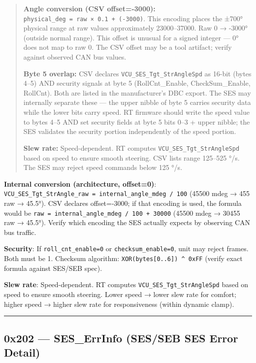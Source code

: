 \documentclass[12pt,a4paper,oneside]{report}
\begin{document}
\begin{quote}
\textbf{Angle conversion (CSV offset=-3000):}
\texttt{physical\_deg\ =\ raw\ ×\ 0.1\ +\ (-3000)}. This encoding places the
±700° physical range at raw values approximately 23000--37000. Raw 0 → -3000°
(outside normal range). This offset is unusual for a signed integer --- 0° does
not map to raw 0. The CSV offset may be a tool artifact; verify against observed
CAN bus values.

\textbf{Byte 5 overlap:} CSV declares \texttt{VCU\_SES\_Tgt\_StrAngleSpd} as
16-bit (bytes 4--5) AND security signals at byte 5 (RollCnt\_Enable,
CheckSum\_Enable, RollCnt). Both are listed in the manufacturer's DBC export.
The SES may internally separate these --- the upper nibble of byte 5 carries
security data while the lower bits carry speed. RT firmware should write the
speed value to bytes 4--5 AND set security fields at byte 5 bits 0--3 + upper
nibble; the SES validates the security portion independently of the speed
portion.

\textbf{Slew rate:} Speed-dependent. RT computes
\texttt{VCU\_SES\_Tgt\_StrAngleSpd} based on speed to ensure smooth steering.
CSV lists range 125--525 °/s. The SES may reject speed commands below 125 °/s.
\end{quote}

\textbf{Internal conversion (architecture, offset=0)}:
\texttt{VCU\_SES\_Tgt\_StrAngle\_raw\ =\ internal\_angle\_mdeg\ /\ 100} (45500
mdeg → 455 raw → 45.5°). CSV declares offset=-3000; if that encoding is used,
the formula would be \texttt{raw\ =\ internal\_angle\_mdeg\ /\ 100\ +\ 30000}
(45500 mdeg → 30455 raw → 45.5°). Verify which encoding the SES actually
expects by observing CAN bus traffic.

\textbf{Security}: If \texttt{roll\_cnt\_enable=0} or
\texttt{checksum\_enable=0}, unit may reject frames. Both must be 1. Checksum
algorithm: \texttt{XOR(bytes{[}0..6{]})\ \^{}\ 0xFF} (verify exact formula
against SES/SEB spec).

\textbf{Slew rate}: Speed-dependent. RT computes
\texttt{VCU\_SES\_Tgt\_StrAngleSpd} based on speed to ensure smooth steering.
Lower speed → lower slew rate for comfort; higher speed → higher slew rate for
responsiveness (within dynamic clamp).

\begin{center}\rule{0.5\linewidth}{0.5pt}\end{center}

\subsection{0x202 --- SES\_ErrInfo (SES/SEB SES Error
Detail)}\label{x202-ses_errinfo-SES/SEB-SES-error-detail}
\end{document}
